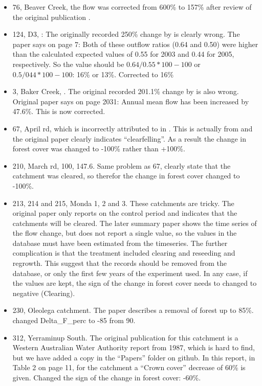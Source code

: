 \documentclass[]{elsarticle} %
\providecommand{\tightlist}{%
  \setlength{\itemsep}{0pt}\setlength{\parskip}{0pt}}
\begin{document}
\begin{itemize}
\tightlist
\item
  76, Beaver Creek, the flow was corrected from 600\% to 157\% after review of the original publication \citep{baker1984}.
\item
  124, D3, \citet{amatya2008effects}: The originally recorded 250\% change by \citet{zhang2017} is clearly wrong. The paper says on page 7: Both of these outflow ratios (0.64 and 0.50) were higher than the calculated expected values of 0.55 for 2003 and 0.44 for 2005, respectively. So the value should be \(0.64/0.55*100 - 100\) or \(0.5/044*100 - 100\): 16\% or 13\%. Corrected to 16\%
\item
  3, Baker Creek, \citet{zhangwei2012}. The original recorded 201.1\% change by \citet{zhang2017} is also wrong. Original paper says on page 2031: Annual mean flow has been increased by 47.6\%. This is now corrected.
\item
  67, April rd, which is incorrectly attributed to \citet{ruprecht1991} in \citet{zhang2017}. This is actually from \citet{ruprecht1989} and the original paper clearly indicates ``clearfelling''. As a result the change in forest cover was changed to -100\% rather than +100\%.
\item
  210, March rd, 100, 147.6. Same problem as 67, \citet{bari1996} clearly state that the catchment was cleared, so therefor the change in forest cover changed to -100\%.
\item
  213, 214 and 215, Monda 1, 2 and 3. These catchments are tricky. The original paper \citep{oshaughnessy1979} only reports on the control period and indicates that the catchments will be cleared. The later summary paper \citep{watson2001} shows the time series of the flow change, but does not report a single value, so the values in the database must have been estimated from the timeseries. The further complication is that the treatment included clearing and reseeding and regrowth. This suggest that the records should be removed from the database, or only the first few years of the experiment used. In any case, if the values are kept, the sign of the change in forest cover needs to changed to negative (Clearing).
\item
  230, Oleolega catchment. The paper describes a removal of forest up to 85\%. changed Delta\_F\_perc to -85 from 90.
\item
  312, Yerraminup South. The original publication for this catchment is a Western Australian Water Authority report from 1987, which is hard to find, but we have added a copy in the ``Papers'' folder on github. In this report, in Table 2 on page 11, for the catchment a ``Crown cover'' decrease of 60\% is given. Changed the sign of the change in forest cover: -60\%.

\end{itemize}
\end{document}
